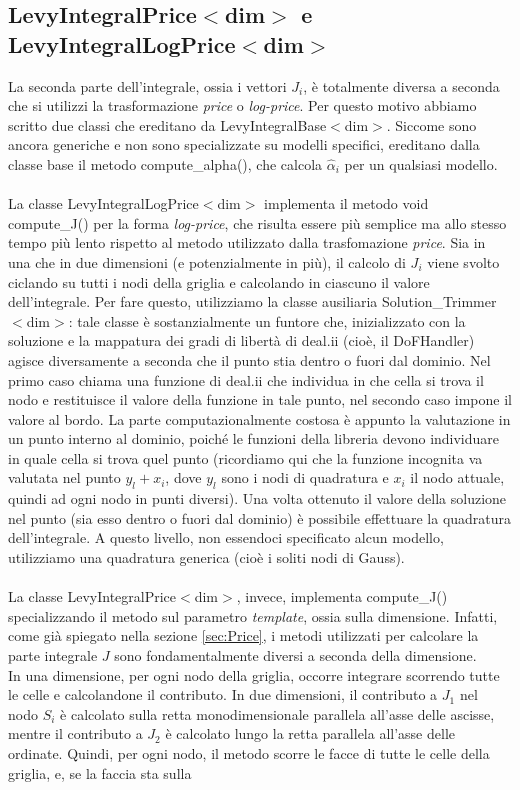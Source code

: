 \documentclass[a4paper,10pt]{report}
\theoremstyle{plain}
\theoremstyle{definition}
\theoremstyle{remark}
\begin{document}
\subsection{\textsf{LevyIntegralPrice$<$dim$>$} e \textsf{LevyIntegralLogPrice$<$dim$>$}}
La seconda parte dell'integrale, ossia i vettori $J_i$, è totalmente diversa a seconda che si utilizzi la trasformazione \emph{price} o \emph{log-price}. Per questo motivo abbiamo scritto due classi che ereditano da \textsf{LevyIntegralBase$<$dim$>$}. Siccome sono ancora generiche e non sono specializzate su modelli specifici, ereditano dalla classe base il metodo \textsf{compute\_alpha()}, che calcola $\hat{\alpha}_i$ per un qualsiasi modello.\\\\La classe \textsf{LevyIntegralLogPrice$<$dim$>$} implementa il metodo \textsf{void compute\_J()} per la forma \emph{log-price}, che risulta essere pi\`u semplice ma allo stesso tempo più lento rispetto al metodo utilizzato dalla trasfomazione \emph{price}. Sia in una che in due dimensioni (e potenzialmente in più), il calcolo di $J_i$ viene svolto ciclando su tutti i nodi della griglia e calcolando in ciascuno il valore dell'integrale. Per fare questo, utilizziamo la classe ausiliaria \textsf{Solution\_Trimmer$<$dim$>$}: tale classe è sostanzialmente un funtore che, inizializzato con la soluzione e la mappatura dei gradi di libertà di \textsf{deal.ii} (cio\`e, il \textsf{DoFHandler}) agisce diversamente a seconda che il punto stia dentro o fuori dal dominio. Nel primo caso chiama una funzione di \textsf{deal.ii} che individua in che cella si trova il nodo e restituisce il valore della funzione in tale punto, nel secondo caso impone il valore al bordo. La parte computazionalmente costosa è appunto la valutazione in un punto interno al dominio, poiché le funzioni della libreria devono individuare in quale cella si trova quel punto (ricordiamo qui che la funzione incognita va valutata nel punto $y_l+x_i$, dove $y_l$ sono i nodi di quadratura e $x_i$ il nodo attuale, quindi ad ogni nodo in punti diversi). Una volta ottenuto il valore della soluzione nel punto (sia esso dentro o fuori dal dominio) è possibile effettuare la quadratura dell'integrale. A questo livello, non essendoci specificato alcun modello, utilizziamo una quadratura generica (cio\`e i soliti nodi di Gauss).\\\\La classe \textsf{LevyIntegralPrice$<$dim$>$}, invece, implementa \textsf{compute\_J()} specializzando il metodo sul parametro \emph{template}, ossia sulla dimensione. Infatti, come già spiegato nella sezione \ref{sec:Price}, i metodi utilizzati per calcolare la parte integrale $J$ sono fondamentalmente diversi a seconda della dimensione.\\In una dimensione, per ogni nodo della griglia, occorre integrare scorrendo tutte le celle e calcolandone il contributo. In due dimensioni, il contributo a $J_1$ nel nodo $S_i$ è calcolato sulla retta monodimensionale parallela all'asse delle ascisse, mentre il contributo a $J_2$ è calcolato lungo la retta parallela all'asse delle ordinate. Quindi, per ogni nodo, il metodo scorre le facce di tutte le celle della griglia, e, se la faccia sta sulla 
\end{document}

